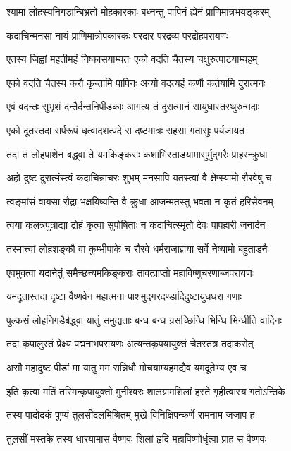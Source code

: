 \twolineshloka
{श्यामा लोहस्यनिगडान्बिभ्रतो मोहकारकाः}
{बध्नन्तु पापिनं ह्येनं प्राणिमात्रभयङ्करम्}%

\twolineshloka
{कदाचिन्मनसा नायं प्राणिमात्रोपकारकः}
{परदार परद्रव्य परद्रोहपरायणः}%

\twolineshloka
{एतस्य जिह्वां महतीमहं निष्कासयाम्यतः}
{एको वदति चैतस्य चक्षुरुत्पाटयाम्यहम्}%

\twolineshloka
{एको वदति चैतस्य करौ कृन्तामि पापिनः}
{अन्यो वदत्यहं कर्णौ कर्तयामि दुरात्मनः}%

\twolineshloka
{एवं वदन्तः सुभृशं दन्तैर्दन्तनिपीडकाः}
{आगत्य तं दुरात्मानं सायुधास्तस्थुरुन्मदाः}%

\twolineshloka
{एको दूतस्तदा सर्परूपं धृत्वादशत्पदे}
{स दष्टमात्रः सहसा गतासुः पर्यजायत}%

\twolineshloka
{तदा तं लोहपाशेन बद्ध्वा ते यमकिङ्कराः}
{कशाभिस्ताडयामासुर्मुद्गरैः प्राहरन्क्रुधा}%

\twolineshloka
{अहो दुष्ट दुरात्मंस्त्वं कदाचिन्नाचरः शुभम्}
{मनसापि यतस्त्वां वै क्षेप्स्यामो रौरवेषु च}%

\twolineshloka
{त्वङ्मांसं वायसा रौद्रा भक्षयिष्यन्ति वै क्रुधा}
{आजन्मतस्तु भवता न कृतं हरिसेवनम्}%

\twolineshloka
{त्वया कलत्रपुत्राद्या द्रोहं कृत्वा सुपोषिताः}
{न कदाचित्स्मृतो देवः पापहारी जनार्दनः}%

\twolineshloka
{तस्मात्त्वां लोहशङ्कौ वा कुम्भीपाके च रौरवे}
{धर्मराजाज्ञया सर्वे नेष्यामो बहुताडनैः}%

\twolineshloka
{एवमुक्त्वा यदानेतुं समैच्छन्यमकिङ्कराः}
{तावत्प्राप्तो महाविष्णुचरणाब्जपरायणः}%

\twolineshloka
{यमदूतास्तदा दृष्टा वैष्णवेन महात्मना}
{पाशमुद्गरदण्डादिदुष्टायुधधरा गणाः}%

\twolineshloka
{पुल्कसं लोहनिगडैर्बद्ध्वा यातुं समुद्यताः}
{बन्ध बन्ध ग्रसच्छिन्धि भिन्धि भिन्धीति वादिनः}%

\twolineshloka
{तदा कृपालुस्तं प्रेक्ष्य पद्मनाभपरायणः}
{अत्यन्तकृपयायुक्तं चेतस्तत्र तदाकरोत्}%

\twolineshloka
{असौ महादुष्ट पीडां मा यातु मम सन्निधौ}
{मोचयाम्यहमद्यैव यमदूतेभ्य एव च}%

\twolineshloka
{इति कृत्वा मतिं तस्मिन्कृपायुक्तो मुनीश्वरः}
{शालग्रामशिलां हस्ते गृहीत्वास्य गतोऽन्तिके}%

\twolineshloka
{तस्य पादोदकं पुण्यं तुलसीदलमिश्रितम्}
{मुखे विनिक्षिपन्कर्णे रामनाम जजाप ह}%

\twolineshloka
{तुलसीं मस्तके तस्य धारयामास वैष्णवः}
{शिलां हृदि महाविष्णोर्धृत्वा प्राह स वैष्णवः}%

